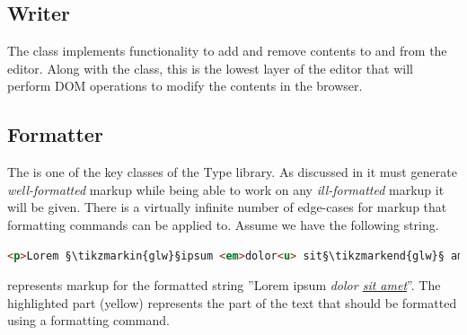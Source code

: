 


\subsection{Writer}

The  class implements functionality to add and remove contents to and from the editor. Along with the  class, this is the lowest layer of the editor that will perform DOM operations to modify the contents in the browser.


\subsection{Formatter}

The  is one of the key classes of the Type library. As discussed in  it must generate \textit{well-formatted} markup while being able to work on any \textit{ill-formatted} markup it will be given. There is a virtually infinite number of edge-cases for markup that formatting commands can be applied to. Assume we have the following string.




\begin{lstlisting}[language=html, caption=Markup with highlighted target for formatting, label=lst:formatter_code_example]
<p>Lorem §\tikzmarkin{glw}§ipsum <em>dolor<u> sit§\tikzmarkend{glw}§ amet</u></em> consec</p>
\end{lstlisting}

 represents markup for the formatted string ''Lorem ipsum \textit{dolor \underline{sit amet}}''. The highlighted part (yellow) represents the part of the text that should be formatted using a formatting command.

